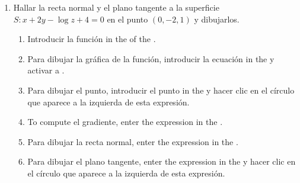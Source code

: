 \begin{enumerate}[leftmargin=*]
\item Hallar la recta normal y el plano tangente a la superficie $S: x+2y-\log z +4 =0$ en el punto $(0,-2,1)$ y dibujarlos.
      \begin{indication}
      \begin{enumerate}
      \item Introducir la función  in the  of the .
      \item Para dibujar la gráfica de la función, introducir la ecuación  in the  y activar a .
      \item Para dibujar el punto, introducir el punto  in the  y hacer clic en el círculo que aparece a la izquierda de esta expresión.
      \item To compute el gradiente, enter the expression  in the .
      \item Para dibujar la recta normal, enter the expression  in the .
      \item Para dibujar el plano tangente, enter the expression  in the  y hacer clic en el círculo que aparece a la izquierda de esta expresión.
      \end{enumerate}
      \end{indication}


\end{enumerate}
